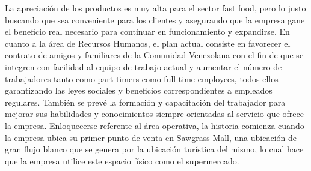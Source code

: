 La apreciación de los productos es muy alta para el sector fast food, pero lo justo buscando que sea conveniente para los clientes y asegurando que la empresa gane el beneficio real necesario para continuar en funcionamiento y expandirse.
En cuanto a la área de Recursos Humanos, el plan actual consiste en favorecer el contrato de amigos y familiares de la Comunidad Venezolana con el fin de que se integren con facilidad al equipo de trabajo actual y aumentar el número de trabajadores tanto como part-timers como full-time employees, todos ellos garantizando las leyes sociales y beneficios correspondientes a empleados regulares. También se prevé la formación y capacitación del trabajador para mejorar sus habilidades y conocimientos siempre orientadas al servicio que ofrece la empresa.
Enloquecerse referente al área operativa, la historia comienza cuando la empresa ubica su primer punto de venta en Sawgrass Mall, una ubicación de gran flujo blanco que se genera por la ubicación turística del mismo, lo cual hace que la empresa utilice este espacio físico como el supermercado.
